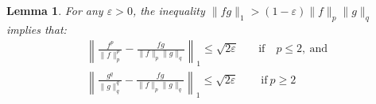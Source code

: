 \documentclass[reqno,oneside,letterpaper,10pt]{article}
\newcommand{\f}{f}
\newcommand{\g}{g}
\newcommand{\q}{q}
\def\p{p}
\newtheorem{lemma}{Lemma}
\begin{document}
\vspace{-0.1in}
\begin{lemma}  
\label{lem:approx0}
For any $\varepsilon>0$, the inequality $\|\f\g\|_1> (1-\varepsilon) \|\f\|_\p \|\g\|_\q$ implies that:
\begin{align}
\left\|
	\frac{\f^{\p}}{\|\f\|^{\p}_{\p}} 
	- 
	\frac{\f\g}{\|\f\|_\p \|\g\|_\q} 
\right\|_1 \le \sqrt{2\varepsilon}
\quad &  \mathrm{if} \quad \p \le 2, \mathrm{\ and}
\nonumber
\\
\left\|
	\frac{\g^{\q}}{\|\g\|^{\q}_{\q}} 
	- 
	\frac{\f\g}{\|\f\|_\p \|\g\|_\q} 
\right\|_1 \le \sqrt{2\varepsilon} 
\quad  & \mathrm{\ if \ } \p\ge 2
\label{eq:fbigger}
\end{align}
\end{lemma} 

\vspace{-0.1in}
\end{document}

